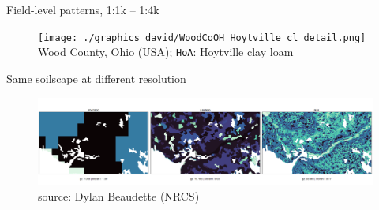 \documentclass[aspectratio=169, 10pt]{beamer}
\begin{document}
\begin{frame}{Field-level patterns, 1:1k -- 1:4k}
        \begin{figure}
        \centering
\texttt{[image: ./graphics\_david/WoodCoOH\_Hoytville\_cl\_detail.png]}\\
{Wood County, Ohio (USA); \texttt{HoA}: Hoytville clay loam}
     \end{figure}
\end{frame}

\begin{frame}{Same soilscape at different resolution}
    \begin{figure}
        \centering
        \includegraphics[width=\linewidth]{./graphics_david/Dylan_ND005-example-01.png}
\\source: Dylan Beaudette (NRCS)
    \end{figure}
\end{frame}


\end{document}
